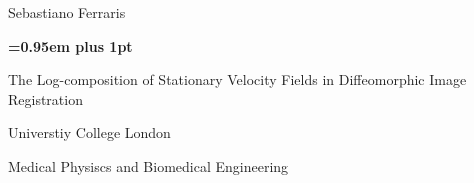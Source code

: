 \documentclass[a4paper,10pt]{book}
\theoremstyle{definition}
\begin{document}
\begin{titlepage}
%
\pagestyle{empty}
\begingroup
\vspace*{-7\topskip}

\vspace{-0.9 cm}

\begin{figure}[!h]
		\hspace{-3.0cm}
\end{figure}
\vspace{1cm}

\begin{center}
	{\LARGE{Sebastiano Ferraris}\par}
\end{center}
\vspace{0.6cm}
\begin{center}
        {\huge\bf \baselineskip=0.95em plus 1pt \expandafter{
        The Log-composition of Stationary Velocity Fields in Diffeomorphic Image Registration
        \par}}
\end{center}



\vspace{5.7cm}

\begin{center}
	\LARGE{\rm\expandafter{Universtiy College London}}\par
	\expandafter{\Large{Medical Physiscs and Biomedical Engineering}\par}
\end{center}


\end{titlepage}
\end{document}
